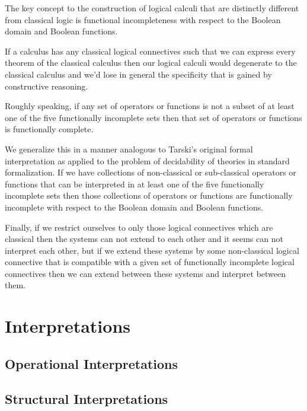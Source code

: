 \documentclass{article}
\begin{document}
\begin{center}
	\begin{flushleft}
		The key concept to the construction of logical calculi that are distinctly different from classical logic is functional incompleteness with respect to the Boolean domain and Boolean functions.
	\end{flushleft}
	\begin{flushleft}
		If a calculus has any classical logical connectives such that we can express every theorem of the classical calculus then our logical calculi would degenerate to the classical calculus and we'd lose in general the specificity that is gained by constructive reasoning.
	\end{flushleft}
	\begin{flushleft}
		Roughly speaking, if any set of operators or functions is not a subset of at least one of the five functionally incomplete sets then that set of operators or functions is functionally complete.
	\end{flushleft}
	\begin{flushleft}
		We generalize this in a manner analogous to Tarski's original formal interpretation as applied to the problem of decidability of theories in standard formalization. If we have collections of non-classical or sub-classical operators or functions that can be interpreted in at least one of the five functionally incomplete sets then those collections of operators or functions are functionally incomplete with respect to the Boolean domain and Boolean functions.
	\end{flushleft}
	\begin{flushleft}
		Finally, if we restrict ourselves to only those logical connectives which are classical then the systems can not extend to each other and it seems can not interpret each other, but if we extend these systems by some non-classical logical connective that is compatible with a given set of functionally incomplete logical connectives then we can extend between these systems and interpret between them.
	\end{flushleft}
	\section{Interpretations}
		\subsection{Operational Interpretations}
		\subsection{Structural Interpretations}

\end{center}
\end{document}
